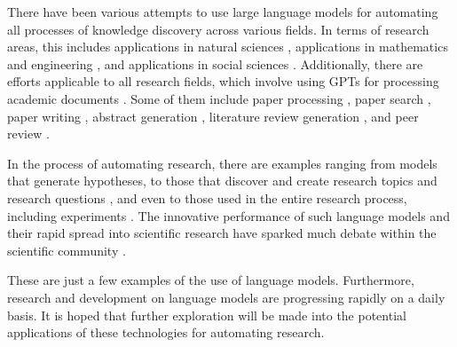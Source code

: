 There have been various attempts to use large language models for automating all processes of knowledge discovery across various fields. In terms of research areas, this includes applications in natural sciences  \cite{ai4science2023impact,bran2023chemcrow,white2022large,hatakeyama2023prompt,jablonka202314,guo2023can,boiko2023emergent,charness2023generation,qin2023gpt,zheng2023large,qian2023can,wysocka2023large,lee2023benefits,nori2023capabilities,wang2023large,singhal2023large,yang2022gatortron,deng2023learning,merchant2023scaling}, applications in mathematics and engineering \cite{wu2023empirical,pursnani2023performance,zheng2023can,zhang2023automl}, and applications in social sciences \cite{wang2023survey,bail2023can,ziems2023can,park2023generative,horton2023large,koneru2023can}. Additionally, there are efforts applicable to all research fields, which involve using GPTs for processing academic documents \cite{alzaabi2023chatgpt}. Some of them include paper processing \cite{elicit,scispace,van2023chatgpt}, paper search \cite{elicit,scispace}, paper writing \cite{transformer2022can}, abstract generation \cite{gao2023comparing}, literature review generation \cite{aydin2022openai}, and peer review \cite{wexin2023can,liu2023reviewergpt,robertson2023gpt4,hosseini2023fighting}. 

In the process of automating research, there are examples ranging from models that generate hypotheses, to those that discover and create research topics and research questions \cite{oppenlaender2023mapping,lahat2023evaluating}, and even to those used in the entire research process, including experiments \cite{boiko2023emergent,charness2023generation,qin2023gpt}. The innovative performance of such language models and their rapid spread into scientific research have sparked much debate within the scientific community \cite{birhane2023science}.

These are just a few examples of the use of language models. Furthermore, research and development on language models are progressing rapidly on a daily basis. It is hoped that further exploration will be made into the potential applications of these technologies for automating research.


